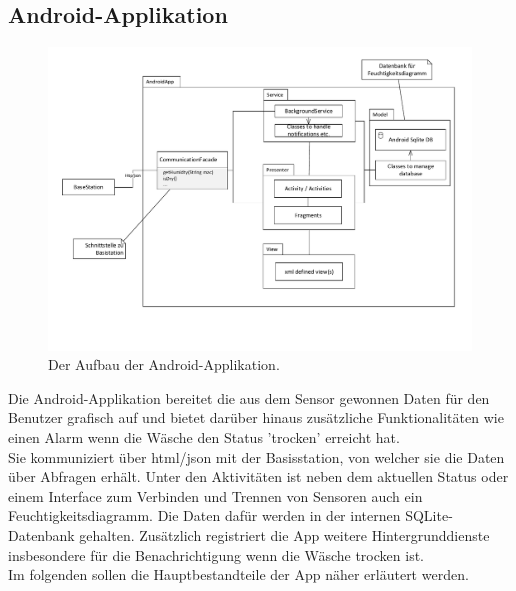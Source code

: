 \subsection{Android-Applikation}
\begin{figure}[htb] 
	\centerline{\includegraphics[scale=.6]{Architektur/App_v2.pdf} }
	\caption{Der Aufbau der Android-Applikation.}
\end{figure}
Die Android-Applikation bereitet die aus dem Sensor gewonnen Daten für den Benutzer grafisch auf und bietet darüber hinaus zusätzliche Funktionalitäten wie einen Alarm wenn die Wäsche den Status 'trocken' erreicht hat.\\
Sie kommuniziert über html/json mit der Basisstation, von welcher sie die Daten über Abfragen erhält. Unter den Aktivitäten ist neben dem aktuellen Status oder einem Interface zum Verbinden und Trennen von Sensoren auch ein Feuchtigkeitsdiagramm. Die Daten dafür werden in der internen SQLite-Datenbank gehalten. Zusätzlich registriert die App weitere Hintergrunddienste insbesondere für die Benachrichtigung wenn die Wäsche trocken ist.\\
Im folgenden sollen die Hauptbestandteile der App näher erläutert werden.

